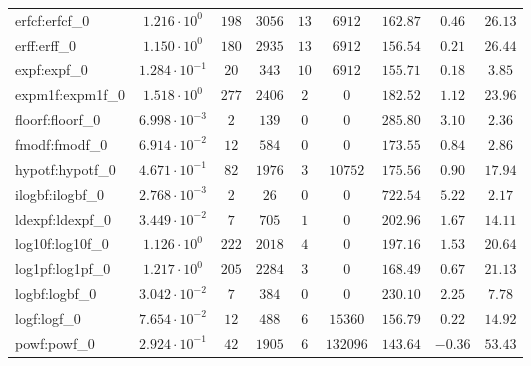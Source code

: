 \begin{tabular}{|l|c|c|c|c|c|c|c|c|}
erfcf:erfcf\_0               & $ 1.216 \cdot 10^{0}  $ & $ 198    $ & $ 3056  $ & $ 13  $ & $ 6912   $ & $ 162.87      $ & $ 0.46    $ & $ 26.13   $ \\
erff:erff\_0                 & $ 1.150 \cdot 10^{0}  $ & $ 180    $ & $ 2935  $ & $ 13  $ & $ 6912   $ & $ 156.54      $ & $ 0.21    $ & $ 26.44   $ \\
expf:expf\_0                 & $ 1.284 \cdot 10^{-1} $ & $ 20     $ & $ 343   $ & $ 10  $ & $ 6912   $ & $ 155.71      $ & $ 0.18    $ & $ 3.85    $ \\
expm1f:expm1f\_0             & $ 1.518 \cdot 10^{0}  $ & $ 277    $ & $ 2406  $ & $ 2   $ & $ 0      $ & $ 182.52      $ & $ 1.12    $ & $ 23.96   $ \\
floorf:floorf\_0             & $ 6.998 \cdot 10^{-3} $ & $ 2      $ & $ 139   $ & $ 0   $ & $ 0      $ & $ 285.80      $ & $ 3.10    $ & $ 2.36    $ \\
fmodf:fmodf\_0               & $ 6.914 \cdot 10^{-2} $ & $ 12     $ & $ 584   $ & $ 0   $ & $ 0      $ & $ 173.55      $ & $ 0.84    $ & $ 2.86    $ \\
hypotf:hypotf\_0             & $ 4.671 \cdot 10^{-1} $ & $ 82     $ & $ 1976  $ & $ 3   $ & $ 10752  $ & $ 175.56      $ & $ 0.90    $ & $ 17.94   $ \\
ilogbf:ilogbf\_0             & $ 2.768 \cdot 10^{-3} $ & $ 2      $ & $ 26    $ & $ 0   $ & $ 0      $ & $ 722.54      $ & $ 5.22    $ & $ 2.17    $ \\
ldexpf:ldexpf\_0             & $ 3.449 \cdot 10^{-2} $ & $ 7      $ & $ 705   $ & $ 1   $ & $ 0      $ & $ 202.96      $ & $ 1.67    $ & $ 14.11   $ \\
log10f:log10f\_0             & $ 1.126 \cdot 10^{0}  $ & $ 222    $ & $ 2018  $ & $ 4   $ & $ 0      $ & $ 197.16      $ & $ 1.53    $ & $ 20.64   $ \\
log1pf:log1pf\_0             & $ 1.217 \cdot 10^{0}  $ & $ 205    $ & $ 2284  $ & $ 3   $ & $ 0      $ & $ 168.49      $ & $ 0.67    $ & $ 21.13   $ \\
logbf:logbf\_0               & $ 3.042 \cdot 10^{-2} $ & $ 7      $ & $ 384   $ & $ 0   $ & $ 0      $ & $ 230.10      $ & $ 2.25    $ & $ 7.78    $ \\
logf:logf\_0                 & $ 7.654 \cdot 10^{-2} $ & $ 12     $ & $ 488   $ & $ 6   $ & $ 15360  $ & $ 156.79      $ & $ 0.22    $ & $ 14.92   $ \\
powf:powf\_0                 & $ 2.924 \cdot 10^{-1} $ & $ 42     $ & $ 1905  $ & $ 6   $ & $ 132096 $ & $ 143.64      $ & $ -0.36   $ & $ 53.43   $ \\

\end{tabular}

